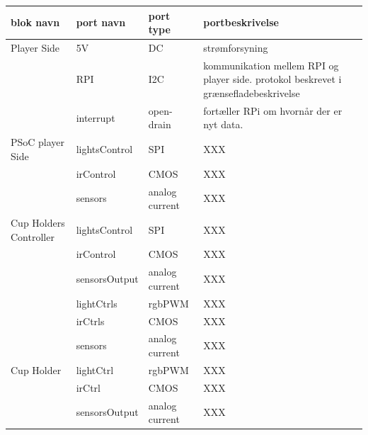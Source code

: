 \documentclass[Arkitektur/System_main.tex]{subfiles}
\begin{document}
\begin{table}[H]
\begin{tabular}{|L{0.2\textwidth}|L{0.2\textwidth}|L{0.2\textwidth}|L{0.4\textwidth}|}
\hline
\textbf{blok navn}               & \textbf{port navn}     & \textbf{port type}         & \textbf{portbeskrivelse}                                                                     \\ \hline
Player Side             & 5V            & DC                & strømforsyning                                                                       \\ \hline
                        & RPI           & I2C               & kommunikation mellem RPI og player side. protokol beskrevet i grænsefladebeskrivelse \\ \hline
                        & interrupt     & open-drain        & fortæller RPi om hvornår der er nyt data. \\ \hline
PSoC player Side        & lightsControl & SPI               & XXX                                                                                  \\ \hline
                        & irControl     & CMOS              & XXX                                                                                  \\ \hline
                        & sensors       & analog current    & XXX \\ \hline
Cup Holders Controller  & lightsControl & SPI               & XXX \\ \hline
                        & irControl     & CMOS              & XXX \\ \hline
                        & sensorsOutput & analog current    & XXX \\ \hline
                        & lightCtrls    & rgbPWM            & XXX \\ \hline
                        & irCtrls       & CMOS              & XXX \\ \hline
                        & sensors       & analog current    & XXX \\ \hline
Cup Holder              & lightCtrl     & rgbPWM            & XXX \\ \hline
                        & irCtrl        & CMOS              & XXX \\ \hline
                        & sensorsOutput & analog current    & XXX \\ \hline
\end{tabular}
\end{table}
\end{document}
